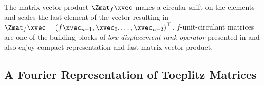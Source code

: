 \noindent
The matrix-vector product $\Zmat_f \xvec$ makes a circular shift on the elements and scales the last element of the vector resulting in $\Zmat_f \xvec = \leftmat f \xvec_{n-1}, \xvec_0, \dots, \xvec_{n-2} \rightmat^\top$.
$f$-unit-circulant matrices are one of the building blocks of \emph{low displacement rank operator} presented in  and also enjoy compact representation and fast matrix-vector product.


\subsection{A Fourier Representation of Toeplitz Matrices}
\label{subsection:ch2-a_fourier_representation_of_toeplitz_matrices}

